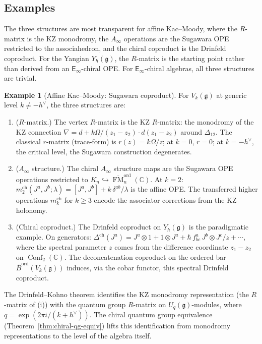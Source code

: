\documentclass[11pt,reqno]{amsart}
\theoremstyle{definition}
\newtheorem{example}[theorem]{Example}
\theoremstyle{remark}
\newcommand{\Ainf}{A_{\infty}}
\newcommand{\Einf}{\mathsf{E}_{\infty}}
\DeclareMathOperator{\Conf}{Conf}
\DeclareMathOperator{\FM}{FM}
\newcommand{\fg}{\mathfrak{g}}
\newcommand{\Barord}{\overline{B}^{\mathrm{ord}}}
\newcommand{\CC}{\mathbb{C}}
\numberwithin{equation}{section}
\begin{document}
\subsection{Examples}
\label{subsec:cqg-examples}

The three structures are most transparent for affine
Kac--Moody, where the $R$-matrix is the KZ monodromy, the
$\Ainf$ operations are the Sugawara OPE restricted to the
associahedron, and the chiral coproduct is the Drinfeld
coproduct. For the Yangian $Y_\hbar(\fg)$, the $R$-matrix
is the starting point rather than derived from an
$\Einf$-chiral OPE. For $\Einf$-chiral algebras, all three
structures are trivial.

\begin{example}[Affine Kac--Moody: Sugawara coproduct]
\label{ex:km-coproduct}
For $V_k(\fg)$ at generic level $k \neq -h^\vee$, the three
structures are:
\begin{enumerate}[label=\textup{(\roman*)}]
\item \textup{($R$-matrix.)} The vertex $R$-matrix is the
  KZ $R$-matrix: the monodromy of the KZ connection
  $\nabla = d + k\Omega/(z_1 - z_2) \cdot d(z_1 - z_2)$
  around $\Delta_{12}$. The classical $r$-matrix
  (trace-form) is
  $r(z) = k\Omega/z$; at $k = 0$, $r = 0$; at
  $k = -h^\vee$, the critical level, the Sugawara
  construction degenerates.
\item \textup{($\Ainf$ structure.)} The chiral $\Ainf$
  structure maps are the Sugawara OPE operations restricted
  to $K_n \hookrightarrow \overline{\FM}_n^{\mathrm{ord}}(\CC)$.
  At $k = 2$: $m_2^{\mathrm{ch}}(J^a, J^b; \lambda)
  = [J^a, J^b] + k\, \delta^{ab}/\lambda$ is the affine
  OPE. The transferred higher operations
  $m_k^{\mathrm{ch}}$ for $k \geq 3$ encode the
  associator corrections from the KZ holonomy.
\item \textup{(Chiral coproduct.)} The Drinfeld
  coproduct on $Y_\hbar(\fg)$ is the paradigmatic example.
  On generators: $\Delta^{\mathrm{ch}}(J^a) = J^a \otimes 1
  + 1 \otimes J^a + \hbar\, f^a_{bc}\, J^b \otimes J^c / z
  + \cdots$, where the spectral parameter $z$ comes from
  the difference coordinate $z_1 - z_2$ on
  $\Conf_2(\CC)$. The deconcatenation coproduct on the
  ordered bar $\Barord(V_k(\fg))$ induces, via the cobar
  functor, this spectral Drinfeld coproduct.
\end{enumerate}
The Drinfeld--Kohno theorem identifies the KZ monodromy
representation (the $R$-matrix of (i)) with the quantum
group $R$-matrix on $U_q(\fg)$-modules, where
$q = \exp(2\pi i / (k + h^\vee))$. The chiral quantum group
equivalence (Theorem~\ref{thm:chiral-qg-equiv}) lifts this
identification from monodromy representations to the level
of the algebra itself.
\end{example}
\end{document}
